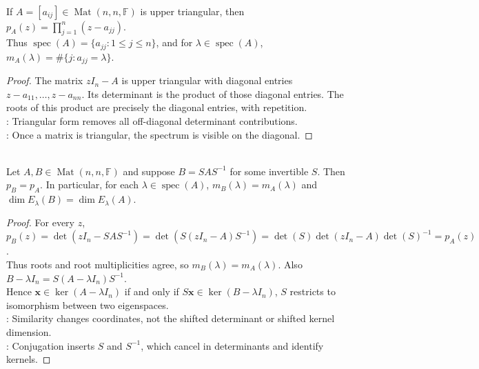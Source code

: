\begin{proposition} \label{prop:upper-triangular-characteristic-polynomial} \\
If $A=[a_{ij}]\in\operatorname{Mat}(n,n,\mathbb{F})$ is upper triangular, then $p_A(z)=\prod\limits_{j=1}^{n}(z-a_{jj})$.\\
Thus $\operatorname{spec}(A)=\{a_{jj}:1\leq j\leq n\}$, and for $\lambda\in\operatorname{spec}(A)$, $m_A(\lambda)=\#\{j:a_{jj}=\lambda\}$.
\begin{proof}
The matrix $zI_n-A$ is upper triangular with diagonal entries $z-a_{11},\ldots,z-a_{nn}$. Its determinant is the product of those diagonal entries. The roots of this product are precisely the diagonal entries, with repetition.\\
: Triangular form removes all off-diagonal determinant contributions.\\
: Once a matrix is triangular, the spectrum is visible on the diagonal.
\end{proof}
\end{proposition}

\begin{theorem} \label{thm:similarity-preserves-characteristic-polynomial} \\
Let $A,B\in\operatorname{Mat}(n,n,\mathbb{F})$ and suppose $B=SAS^{-1}$ for some invertible $S$. Then $p_B=p_A$. In particular, for each $\lambda\in\operatorname{spec}(A)$, $m_B(\lambda)=m_A(\lambda)$ and $\dim E_{\lambda}(B)=\dim E_{\lambda}(A)$.
\begin{proof}
For every $z$, $p_B(z) =\det(zI_n-SAS^{-1}) =\det(S(zI_n-A)S^{-1}) =\det(S)\det(zI_n-A)\det(S)^{-1} =p_A(z)$.\\
Thus roots and root multiplicities agree, so $m_B(\lambda)=m_A(\lambda)$. Also $B-\lambda I_n=S(A-\lambda I_n)S^{-1}$.\\
Hence $\mathbf{x}\in\ker(A-\lambda I_n)$ if and only if $S\mathbf{x}\in\ker(B-\lambda I_n)$, $S$ restricts to isomorphism between two eigenspaces.\\
: Similarity changes coordinates, not the shifted determinant or shifted kernel dimension.\\
: Conjugation inserts $S$ and $S^{-1}$, which cancel in determinants and identify kernels.
\end{proof}
\end{theorem}

